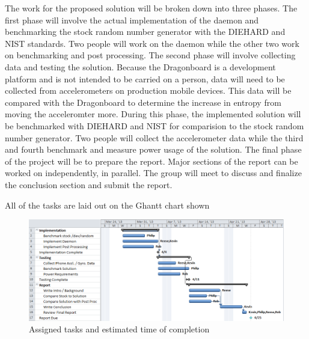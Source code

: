 
The work for the proposed solution will be broken down into three phases.  The first phase will involve the actual implementation of the daemon and benchmarking the stock random number generator with the DIEHARD and NIST standards.  Two people will work on the daemon while the other two work on benchmarking and post processing.  The second phase will involve collecting data and testing the solution.  Because the Dragonboard is a development platform and is not intended to be carried on a person, data will need to be collected from accelerometers on production mobile devices.  This data will be compared with the Dragonboard to determine the increase in entropy from moving the acceleromter more.  During this phase, the implemented solution will be benchmarked with DIEHARD and NIST for comparision to the stock random number generator.  Two people will collect the accelerometer data while the third and fourth benchmark and measure power usage of the solution.  The final phase of the project will be to prepare the report.  Major sections of the report can be worked on independently, in parallel.  The group will meet to discuss and finalize the conclusion section and submit the report.  

All of the tasks are laid out on the Ghantt chart shown

\begin{figure}[t]
	\includegraphics[]{proj-ghantt-v3}
	\caption{Assigned tasks and estimated time of completion}
	\label{Ghantt Chart}
\end{figure}
